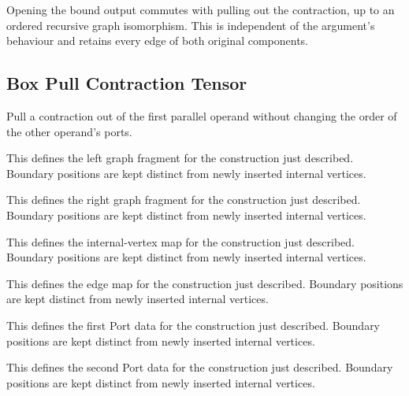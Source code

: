 Opening the bound output commutes with pulling out the contraction, up to an ordered recursive graph isomorphism. This is independent of the argument's behaviour and retains every edge of both original components.
\par{}

\subsection{Box Pull Contraction Tensor}
Pull a contraction out of the first parallel operand without changing the order of the other operand's ports.

This defines the left graph fragment for the construction just described. Boundary positions are kept distinct from newly inserted internal vertices.
\par{}

This defines the right graph fragment for the construction just described. Boundary positions are kept distinct from newly inserted internal vertices.
\par{}

This defines the internal-vertex map for the construction just described. Boundary positions are kept distinct from newly inserted internal vertices.
\par{}

This defines the edge map for the construction just described. Boundary positions are kept distinct from newly inserted internal vertices.
\par{}

This defines the first Port data for the construction just described. Boundary positions are kept distinct from newly inserted internal vertices.
\par{}

This defines the second Port data for the construction just described. Boundary positions are kept distinct from newly inserted internal vertices.
\par{}

